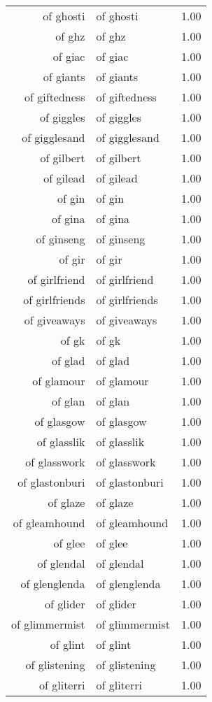 \begin{table}[ht]
\begin{tabular}{rlr}
  of ghosti & of ghosti & 1.00 \\ 
  of ghz & of ghz & 1.00 \\ 
  of giac & of giac & 1.00 \\ 
  of giants & of giants & 1.00 \\ 
  of giftedness & of giftedness & 1.00 \\ 
  of giggles & of giggles & 1.00 \\ 
  of gigglesand & of gigglesand & 1.00 \\ 
  of gilbert & of gilbert & 1.00 \\ 
  of gilead & of gilead & 1.00 \\ 
  of gin & of gin & 1.00 \\ 
  of gina & of gina & 1.00 \\ 
  of ginseng & of ginseng & 1.00 \\ 
  of gir & of gir & 1.00 \\ 
  of girlfriend & of girlfriend & 1.00 \\ 
  of girlfriends & of girlfriends & 1.00 \\ 
  of giveaways & of giveaways & 1.00 \\ 
  of gk & of gk & 1.00 \\ 
  of glad & of glad & 1.00 \\ 
  of glamour & of glamour & 1.00 \\ 
  of glan & of glan & 1.00 \\ 
  of glasgow & of glasgow & 1.00 \\ 
  of glasslik & of glasslik & 1.00 \\ 
  of glasswork & of glasswork & 1.00 \\ 
  of glastonburi & of glastonburi & 1.00 \\ 
  of glaze & of glaze & 1.00 \\ 
  of gleamhound & of gleamhound & 1.00 \\ 
  of glee & of glee & 1.00 \\ 
  of glendal & of glendal & 1.00 \\ 
  of glenglenda & of glenglenda & 1.00 \\ 
  of glider & of glider & 1.00 \\ 
  of glimmermist & of glimmermist & 1.00 \\ 
  of glint & of glint & 1.00 \\ 
  of glistening & of glistening & 1.00 \\ 
  of gliterri & of gliterri & 1.00 \\ 

\end{tabular}
\end{table}
